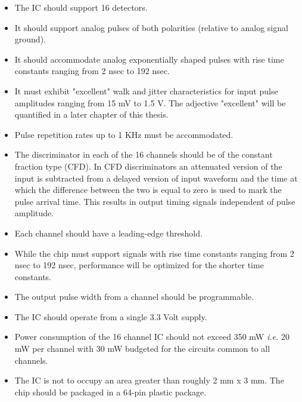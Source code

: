 \documentclass[12pt,oneside,final]{siuethesis}
\theoremstyle{definition}
\begin{document}
\begin{itemize}
\item
The IC should support 16 detectors.
\item
It should support analog pulses of both polarities (relative to analog signal ground).
\item
It should accommodate analog exponentially shaped pulses with rise time constants ranging from 2 nsec to 192 nsec.
\item
It must exhibit "excellent" walk and jitter characteristics for input pulse amplitudes ranging from 15 mV to 1.5 V. The adjective "excellent" will be quantified in a later chapter of this thesis.
\item
Pulse repetition rates up to 1 KHz must be accommodated.
\item
The discriminator in each of the 16 channels should be of the constant fraction type (CFD). In CFD discriminators an attenuated version of the input is subtracted from a delayed version of input waveform and the time at which the difference between the two is equal to zero is used to mark the pulse arrival time. This results in output timing signals independent of pulse amplitude.
\item
Each channel should have a leading-edge threshold.
\item
While the chip must support signals with rise time constants ranging from 2 nsec to 192 nsec, performance will be optimized for the shorter time constants. 
\item
The output pulse width from a channel should be programmable.
\item
The IC should operate from a single 3.3 Volt supply.
\item
Power consumption of the 16 channel IC should not exceed 350 mW \emph{i.e.} 20 mW per channel with 30 mW budgeted for the circuits common to all channels. 
\item
The IC is not to occupy an area greater than roughly 2 mm x 3 mm.  The chip should be packaged in a 64-pin plastic package.  

\end{itemize} 
\end{document}
